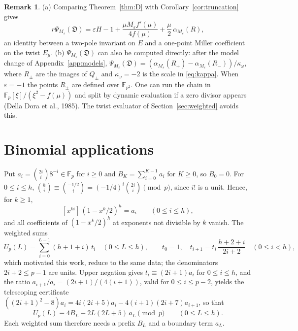 \documentclass[11pt,a4paper]{article}
\numberwithin{equation}{section}
\theoremstyle{plain}
\theoremstyle{definition}
\newtheorem{remark}[theorem]{Remark}
\newcommand{\F}{\mathbb{F}}
\newcommand{\D}{\mathfrak{D}}
\newcommand{\eps}{\varepsilon}
\begin{document}
\begin{remark}\label{rem:compare}
(a) Comparing Theorem~\ref{thm:D} with Corollary~\ref{cor:truncation} gives
\[
r\Psi_{M_\eps}(\D)=\eps H-1+\frac{\mu M_\eps f'(\mu)}{4f(\mu)}+\frac\mu2\,\alpha_{M_\eps}(R),
\]
an identity between a two-pole invariant on $E$ and a one-point Miller coefficient on the twist $E_\mu$.
(b) $\Psi_{M_\eps}(\D)$ can also be computed directly: after the model change of Appendix~\ref{app:models}, $\Psi_{M_\eps}(\D)=(\alpha_{M_\eps}(R_+)-\alpha_{M_\eps}(R_-))/\kappa_\omega$, where $R_\pm$ are the images of $Q_\pm$ and $\kappa_\omega=-2$ is the scale in \eqref{eq:kappa}. When $\eps=-1$ the points $R_\pm$ are defined over $\F_{p^2}$. One can run the chain in $\F_p[\xi]/(\xi^2-f(\mu))$ and split by dynamic evaluation if a zero divisor appears (Della Dora et al., 1985). The twist evaluator of Section~\ref{sec:weighted} avoids this.
\end{remark}

\section{Binomial applications}\label{sec:binomial}

Put $a_i=\binom{2i}{i}8^{-i}\in\F_p$ for $i\ge0$ and $B_K=\sum_{i=0}^{K-1}a_i$ for $K\ge0$, so $B_0=0$. For $0\le i\le h$, $\binom{h}{i}\equiv\binom{-1/2}{i}=(-1/4)^i\binom{2i}{i}\pmod p$, since $i!$ is a unit. Hence, for $k\ge1$,
\begin{equation}\label{eq:coeffs}
[x^{ki}]\,(1-x^k/2)^h=a_i\qquad(0\le i\le h),
\end{equation}
and all coefficients of $(1-x^k/2)^h$ at exponents not divisible by $k$ vanish. The weighted sums
\begin{equation}\label{eq:U}
U_p(L)=\sum_{i=0}^{L-1}(h+1+i)\,t_i\quad(0\le L\le h),\qquad t_0=1,\quad t_{i+1}=t_i\,\frac{h+2+i}{2i+2}\quad(0\le i<h),
\end{equation}
which motivated this work, reduce to the same data; the denominators $2i+2\le p-1$ are units. Upper negation gives $t_i\equiv(2i+1)a_i$ for $0\le i\le h$, and the ratio $a_{i+1}/a_i=(2i+1)/(4(i+1))$, valid for $0\le i\le p-2$, yields the telescoping certificate $((2i+1)^2-8)a_i=4i(2i+5)a_i-4(i+1)(2i+7)a_{i+1}$, so that
\begin{equation}\label{eq:Ucong}
U_p(L)\equiv4B_L-2L(2L+5)\,a_L\pmod p\qquad(0\le L\le h).
\end{equation}
Each weighted sum therefore needs a prefix $B_L$ and a boundary term $a_L$.
\end{document}
